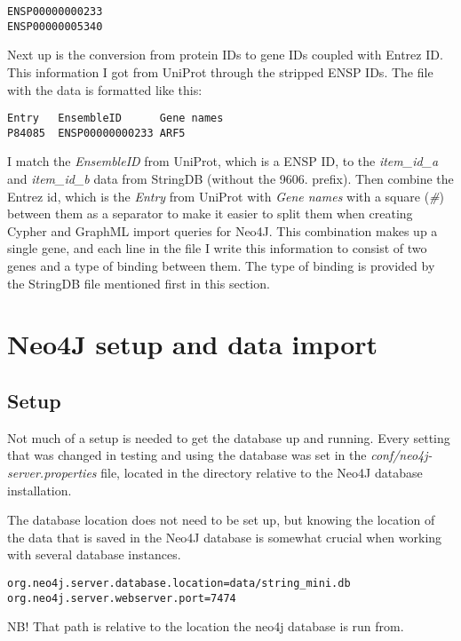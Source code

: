 \begin{verbatim}
ENSP00000000233
ENSP00000005340
\end{verbatim}

Next up is the conversion from protein IDs to gene IDs coupled with Entrez ID.
This information I got from UniProt through the stripped ENSP IDs. The file with
the data is formatted like this:

\begin{verbatim}
Entry	EnsembleID	    Gene names
P84085	ENSP00000000233	ARF5
\end{verbatim}

I match the \textit{EnsembleID} from UniProt, which is a ENSP ID, to the
\textit{item\_id\_a} and \textit{item\_id\_b} data from StringDB (without the
9606.  prefix). Then combine the Entrez id, which is the \textit{Entry} from
UniProt with \textit{Gene names} with a square (\textit{\#}) between them as
a separator to make it easier to split them when creating Cypher and GraphML
import queries for Neo4J. This combination makes up a single gene, and each line
in the file I write this information to consist of two genes and a type of
binding between them. The type of binding is provided by the StringDB file
mentioned first in this section. %


\section{Neo4J setup and data import}

\subsection{Setup}
Not much of a setup is needed to get the database up and running. Every setting
that was changed in testing and using the database was set in the
\textit{conf/neo4j-server.properties} file, located in the directory relative to
the Neo4J database installation.

The database
location does not need to be set up, but knowing the location of the data that
is saved in the Neo4J database is somewhat crucial when working with several
database instances.

\begin{verbatim}
org.neo4j.server.database.location=data/string_mini.db
org.neo4j.server.webserver.port=7474
\end{verbatim}

NB! That path is relative to the location the neo4j database is run from.

